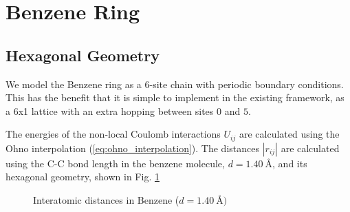 \section{Benzene Ring}






\subsection{Hexagonal Geometry}

We model the Benzene ring as a 6-site chain with periodic boundary conditions. This has the benefit that it is simple to implement in the existing framework, as a 6x1 lattice with an extra hopping between sites $0$ and $5$. 


\medskip

The energies of the non-local Coulomb interactions $U_{ij}$ are calculated using the Ohno interpolation (\ref{eq:ohno_interpolation}). The distances $|r_{ij}|$ are calculated using the C-C bond length in the benzene molecule, $d=\SI{1.40}{\angstrom}$, and its hexagonal geometry, shown in Fig. \ref{fig:benzene_distances}

\begin{figure}[!hbt]
    \centering
    \caption{Interatomic distances in Benzene ($d=\SI{1.40}{\angstrom})$}
    \label{fig:benzene_distances}
\end{figure}

